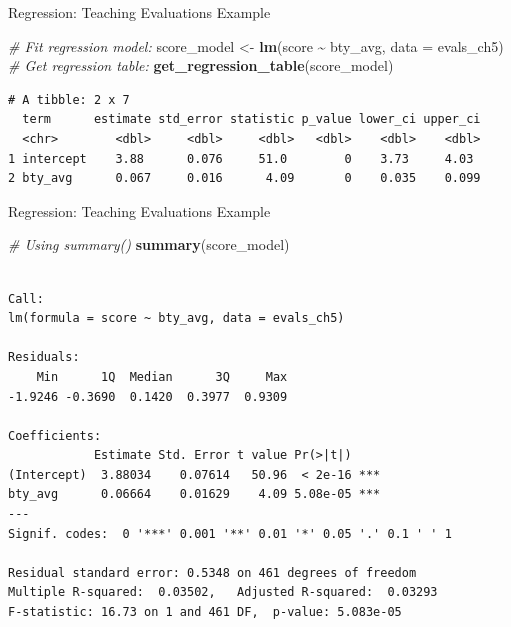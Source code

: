 \documentclass[
  ignorenonframetext,
]{beamer}
\newenvironment{Shaded}{\begin{snugshade}}{\end{snugshade}}
\newcommand{\AttributeTok}[1]{\textcolor[rgb]{0.13,0.29,0.53}{#1}}
\newcommand{\CommentTok}[1]{\textcolor[rgb]{0.56,0.35,0.01}{\textit{#1}}}
\newcommand{\FunctionTok}[1]{\textcolor[rgb]{0.13,0.29,0.53}{\textbf{#1}}}
\newcommand{\NormalTok}[1]{#1}
\newcommand{\OtherTok}[1]{\textcolor[rgb]{0.56,0.35,0.01}{#1}}
\newcommand{\SpecialCharTok}[1]{\textcolor[rgb]{0.81,0.36,0.00}{\textbf{#1}}}
\begin{document}
\begin{frame}[fragile]{Regression: Teaching Evaluations Example}
\protect\hypertarget{regression-teaching-evaluations-example-2}{}
\small

\begin{Shaded}
\begin{Highlighting}[]
\CommentTok{\# Fit regression model:}
\NormalTok{score\_model }\OtherTok{\textless{}{-}} \FunctionTok{lm}\NormalTok{(score }\SpecialCharTok{\textasciitilde{}}\NormalTok{ bty\_avg, }\AttributeTok{data =}\NormalTok{ evals\_ch5)}
\CommentTok{\# Get regression table:}
\FunctionTok{get\_regression\_table}\NormalTok{(score\_model)}
\end{Highlighting}
\end{Shaded}

\begin{verbatim}
# A tibble: 2 x 7
  term      estimate std_error statistic p_value lower_ci upper_ci
  <chr>        <dbl>     <dbl>     <dbl>   <dbl>    <dbl>    <dbl>
1 intercept    3.88      0.076     51.0        0    3.73     4.03 
2 bty_avg      0.067     0.016      4.09       0    0.035    0.099
\end{verbatim}
\end{frame}

\begin{frame}[fragile]{Regression: Teaching Evaluations Example}
\protect\hypertarget{regression-teaching-evaluations-example-3}{}
\small

\begin{Shaded}
\begin{Highlighting}[]
\CommentTok{\# Using summary()}
\FunctionTok{summary}\NormalTok{(score\_model)}
\end{Highlighting}
\end{Shaded}

\begin{verbatim}

Call:
lm(formula = score ~ bty_avg, data = evals_ch5)

Residuals:
    Min      1Q  Median      3Q     Max 
-1.9246 -0.3690  0.1420  0.3977  0.9309 

Coefficients:
            Estimate Std. Error t value Pr(>|t|)    
(Intercept)  3.88034    0.07614   50.96  < 2e-16 ***
bty_avg      0.06664    0.01629    4.09 5.08e-05 ***
---
Signif. codes:  0 '***' 0.001 '**' 0.01 '*' 0.05 '.' 0.1 ' ' 1

Residual standard error: 0.5348 on 461 degrees of freedom
Multiple R-squared:  0.03502,   Adjusted R-squared:  0.03293 
F-statistic: 16.73 on 1 and 461 DF,  p-value: 5.083e-05
\end{verbatim}
\end{frame}
\end{document}
